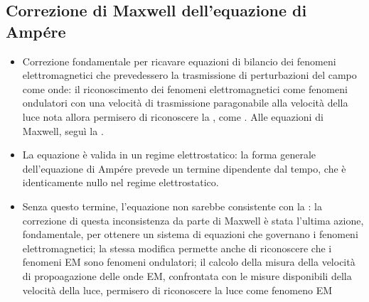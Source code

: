 \documentclass[letterpaper,10pt,italian]{jupyterBook}
\begin{document}
\subsection{Correzione di Maxwell dell’equazione di Ampére}
\label{\detokenize{ch/electromagnetism/electromagnetism-general:correzione-di-maxwell-dell-equazione-di-ampere}}\label{\detokenize{ch/electromagnetism/electromagnetism-general:physics-hs-electromagnetism-electromagnetism-general-ampere-maxwell}}\begin{itemize}
\item {} 
\sphinxAtStartPar
Correzione fondamentale per ricavare equazioni di bilancio dei fenomeni elettromagnetici che prevedessero la trasmissione di perturbazioni del campo come onde: il riconoscimento dei fenomeni elettromagnetici come fenomeni ondulatori con una velocità di trasmissione paragonabile alla velocità della luce nota allora permisero di riconoscere la , come {\hyperref[\detokenize{ch/electromagnetism/em-waves:physics-hs-electromagnetism-em-waves}]{}}. Alle equazioni di Maxwell, seguì la {\hyperref[\detokenize{ch/electromagnetism/em-waves:physics-hs-electromagnetism-em-waves-hertz}]{}}.

\item {} 
\sphinxAtStartPar
La {\hyperref[\detokenize{ch/electromagnetism/electromagnetism-steady:physics-hs-electromagnetism-electromagnetism-steady-maxwell-ampere}]{}} equazione è valida  in un regime elettrostatico: la forma generale dell’equazione di Ampére prevede un termine dipendente dal tempo, che è identicamente nullo nel regime elettrostatico.

\item {} 
\sphinxAtStartPar
Senza questo termine, l’equazione non sarebbe consistente con la {\hyperref[\detokenize{ch/electromagnetism/electric-current:physics-hs-electromagnetism-charge-conservation}]{}}: la correzione di questa inconsistenza da parte di Maxwell è stata l’ultima azione, fondamentale, per ottenere un sistema di equazioni che governano i fenomeni elettromagnetici; la stessa modifica permette anche di riconoscere che i fenomeni EM sono fenomeni ondulatori; il calcolo della misura della velocità di propoagazione delle onde EM, confrontata con le misure disponibili della velocità della luce, permisero di riconoscere la luce come fenomeno EM

\end{itemize}
\end{document}
